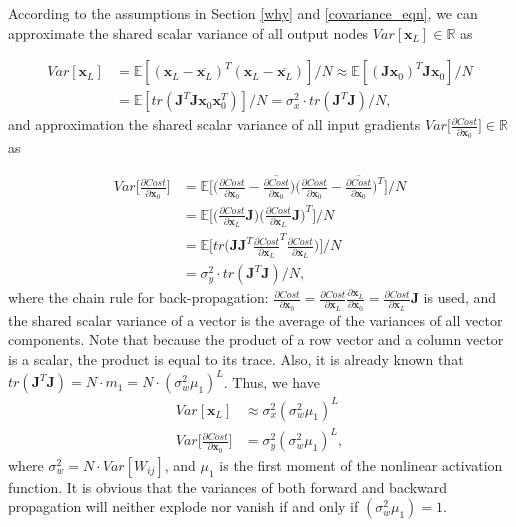According to the assumptions in Section \ref{why} and  \eqref{covariance_eqn},
we can approximate the shared scalar variance of all output nodes $Var[\mathbf{x}_L]\in\mathbb{R}$ as

\begin{equation}
    \begin{aligned}
    Var[\mathbf{x}_L] &=\mathbb{E}[(\mathbf{x}_L-\overline{\mathbf{x}_L})^T(\mathbf{x}_L-\overline{\mathbf{x}_L})]/N
    \approx \mathbb{E}[(\mathbf{Jx}_0)^T\mathbf{Jx}_0]/N\\
    &=\mathbb{E}[tr(\mathbf{J}^T\mathbf{J}\mathbf{x}_0\mathbf{x}_0^T)]/N
    =\sigma_x^2\cdot tr(\mathbf{J}^T\mathbf{J})/N,
    \label{xvar_to_trace}
    \end{aligned}
\end{equation}
and approximation the shared scalar variance of all input gradients $Var\Big[\frac{\partial Cost}{\partial \mathbf{x}_0}\Big]\in\mathbb{R}$ as

\begin{equation}
    \begin{aligned}
    Var\Big[\frac{\partial Cost}{\partial \mathbf{x}_0}\Big]
    &=\mathbb{E}\Big[\Big(\frac{\partial Cost}{\partial \mathbf{x}_0}-\overline{\frac{\partial Cost}{\partial \mathbf{x}_0}}\Big)
    \Big(\frac{\partial Cost}{\partial \mathbf{x}_0}-\overline{\frac{\partial Cost}{\partial \mathbf{x}_0}}\Big)^T\Big]\Big/N
    \\
    &= \mathbb{E}\Big[
    \Big(\frac{\partial Cost}{\partial \mathbf{x}_L}\mathbf{J}\Big)
    \Big(\frac{\partial Cost}{\partial \mathbf{x}_L}\mathbf{J}\Big)^T\Big]\Big/N
    \\
    &=\mathbb{E}\Big[tr\Big(\mathbf{J}\mathbf{J}^T\frac{\partial Cost}{\partial \mathbf{x}_L}^T\frac{\partial Cost}{\partial \mathbf{x}_L}\Big)\Big]/N
    \\
    &=\sigma_y^2\cdot tr(\mathbf{J}^T\mathbf{J})/N,
    \end{aligned}
    \label{yvar_to_trace}
\end{equation}
where the chain rule for back-propagation: $\frac{\partial Cost}{\partial \mathbf{x}_0}=\frac{\partial Cost}{\partial \mathbf{x}_L}\frac{\partial \mathbf{x}_L}{\partial \mathbf{x}_0}=\frac{\partial Cost}{\partial \mathbf{x}_L}\mathbf{J}$ is used, and the shared scalar variance of a vector is the average of the variances of all vector components.
Note that because the product of a row vector and a column vector is a scalar, the product is equal to its trace. Also, it is already known that
$tr(\mathbf{J}^T\mathbf{J})=N\cdot m_1=N\cdot(\sigma_w^2\mu_1)^L$. Thus, we have
\begin{equation}
    \begin{aligned}
    Var[\mathbf{x}_L]&\approx\sigma_x^2(\sigma_w^2\mu_1)^L\\
    Var\Big[\frac{\partial Cost}{\partial \mathbf{x}_0}\Big]&=\sigma_y^2(\sigma_w^2\mu_1)^L,
    \end{aligned}
\end{equation}
where $\sigma_w^2=N\cdot Var[W_{ij}]$, and $\mu_1$ is the first moment of the nonlinear activation function. It is obvious that the variances of
both forward and backward propagation will neither explode nor vanish if and only if
$(\sigma_w^2\mu_1)=1$.

